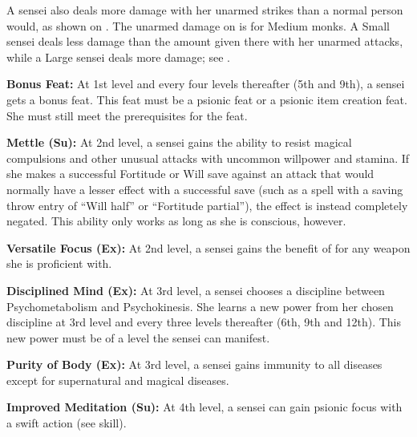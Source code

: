 {A sensei also deals more damage with her unarmed strikes than a normal person would, as shown on . The unarmed damage on  is for Medium monks. A Small sensei deals less damage than the amount given there with her unarmed attacks, while a Large sensei deals more damage; see .


\textbf{Bonus Feat:} At 1st level and every four levels thereafter (5th and 9th), a sensei gets a bonus feat. This feat must be a psionic feat or a psionic item creation feat. She must still meet the prerequisites for the feat.

\textbf{Mettle (Su):} At 2nd level, a sensei gains the ability to resist magical compulsions and other unusual attacks with uncommon willpower and stamina. If she makes a successful Fortitude or Will save against an attack that would normally have a lesser effect with a successful save (such as a spell with a saving throw entry of ``Will half'' or ``Fortitude partial''), the effect is instead completely negated. This ability only works as long as she is conscious, however.

\textbf{Versatile Focus (Ex):} At 2nd level, a sensei gains the benefit of  for any weapon she is proficient with.

\textbf{Disciplined Mind (Ex):} At 3rd level, a sensei chooses a discipline between Psychometabolism and Psychokinesis. She learns a new power from her chosen discipline at 3rd level and every three levels thereafter (6th, 9th and 12th). This new power must be of a level the sensei can manifest.

\textbf{Purity of Body (Ex):} At 3rd level, a sensei gains immunity to all diseases except for supernatural and magical diseases.

\textbf{Improved Meditation (Su):} At 4th level, a sensei can gain psionic focus with a swift action (see  skill).

}

